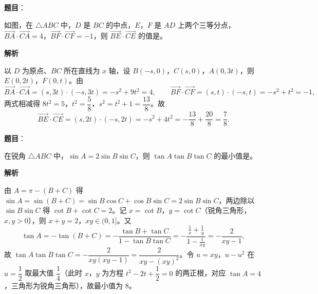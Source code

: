 \begin{answer}

\textbf{题目}：

如图，在 \(\triangle ABC\) 中，\(D\) 是 \(BC\) 的中点，\(E\)，\(F\) 是 \(AD\) 上两个三等分点，\(\overrightarrow{BA}\cdot\overrightarrow{CA}=4\)，\(\overrightarrow{BF}\cdot\overrightarrow{CF}=-1\)，则 \(\overrightarrow{BE}\cdot\overrightarrow{CE}\) 的值是\gkblank{}。
\nopagebreak[4]
\begin{center}\end{center}
\nopagebreak[4]
\textbf{解析}

以 \(D\) 为原点、\(BC\) 所在直线为 \(x\) 轴，设 \(B(-s,0)\)，\(C(s,0)\)，\(A(0,3t)\)，则 \(E(0,2t)\)，\(F(0,t)\)。由
\nopagebreak[4]
\[
\overrightarrow{BA}\cdot\overrightarrow{CA}=(s,3t)\cdot(-s,3t)=-s^{2}+9t^{2}=4,\qquad
\overrightarrow{BF}\cdot\overrightarrow{CF}=(s,t)\cdot(-s,t)=-s^{2}+t^{2}=-1,
\]
两式相减得 \(8t^{2}=5\)，\(t^{2}=\dfrac{5}{8}\)，\(s^{2}=t^{2}+1=\dfrac{13}{8}\)。故
\nopagebreak[4]
\[
\overrightarrow{BE}\cdot\overrightarrow{CE}=(s,2t)\cdot(-s,2t)=-s^{2}+4t^{2}=-\frac{13}{8}+\frac{20}{8}=\frac{7}{8}.
\]


\end{answer}
\begin{answer}

\textbf{题目}：

在锐角 \(\triangle ABC\) 中，\(\sin A=2\sin B\sin C\)，则 \(\tan A\tan B\tan C\) 的最小值是\gkblank{}。

\textbf{解析}

由 \(A=\pi-(B+C)\) 得 \(\sin A=\sin(B+C)=\sin B\cos C+\cos B\sin C=2\sin B\sin C\)，两边除以 \(\sin B\sin C\) 得 \(\cot B+\cot C=2\)。记 \(x=\cot B\)，\(y=\cot C\)（锐角三角形，\(x,y>0\)），则 \(x+y=2\)，\(xy\in(0,1]\)。又
\nopagebreak[4]
\[
\tan A=-\tan(B+C)=-\frac{\tan B+\tan C}{1-\tan B\tan C}=-\frac{\frac{1}{x}+\frac{1}{y}}{1-\frac{1}{xy}}=-\frac{2}{xy-1},
\]
故 \(\tan A\tan B\tan C=-\dfrac{2}{xy(xy-1)}=\dfrac{2}{xy-(xy)^{2}}\)。令 \(u=xy\)，\(u-u^{2}\) 在 \(u=\dfrac{1}{2}\) 取最大值 \(\dfrac{1}{4}\)（此时 \(x\)，\(y\) 为方程 \(t^{2}-2t+\dfrac{1}{2}=0\) 的两正根，对应 \(\tan A=4\)，三角形为锐角三角形），故最小值为 \(8\)。


\end{answer}
